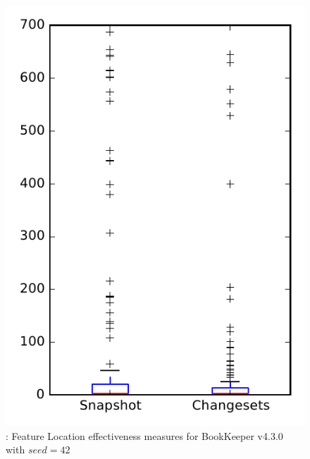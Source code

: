 
\begin{figure}
\centering
\includegraphics[height=0.4\textheight]{figures/flt_seed/rq1_bookkeeper_42}
\caption{\rone: Feature Location effectiveness measures for BookKeeper v4.3.0 with $seed=42$}
\label{fig:flt_seed:rq1:bookkeeper}
\end{figure}
